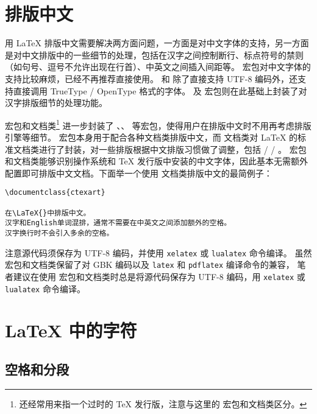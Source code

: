 \section{排版中文}\label{sec:chinese}

用 \LaTeX{} 排版中文需要解决两方面问题，一方面是对中文字体的支持，另一方面是对中文排版中的一些细节的处理，包括在汉字之间控制断行、标点符号的禁则（如句号、逗号不允许出现在行首）、中英文之间插入间距等。 宏包对中文字体的支持比较麻烦，已经不再推荐直接使用。
 和  除了直接支持 UTF-8 编码外，还支持直接调用 TrueType / OpenType 格式的字体。 及  宏包则在此基础上封装了对汉字排版细节的处理功能。

 宏包和文档类\footnote{ 还经常用来指一个过时的 \TeX{} 发行版，注意与这里的  宏包和文档类区分。}%
进一步封装了 、、 等宏包，使得用户在排版中文时不用再考虑排版引擎等细节。 宏包本身用于配合各种文档类排版中文，而  文档类对 \LaTeX{} 的标准文档类进行了封装，对一些排版根据中文排版习惯做了调整，包括  /  / 。
 宏包和文档类能够识别操作系统和 \TeX{} 发行版中安装的中文字体，因此基本无需额外配置即可排版中文文档。下面举一个使用  文档类排版中文的最简例子：

\begin{verbatim}
\documentclass{ctexart}

在\LaTeX{}中排版中文。
汉字和English单词混排，通常不需要在中英文之间添加额外的空格。
汉字换行时不会引入多余的空格。

\end{verbatim}

注意源代码须保存为 UTF-8 编码，并使用 \texttt{xelatex} 或 \texttt{lualatex} 命令编译。
虽然  宏包和文档类保留了对 GBK 编码以及 \texttt{latex} 和 \texttt{pdflatex} 编译命令的兼容，
笔者建议在使用  宏包和文档类时总是将源代码保存为 UTF-8 编码，用 \texttt{xelatex} 或 \texttt{lualatex} 命令编译。

\section{\LaTeX{} 中的字符}\label{sec:text-symbols}

\subsection{空格和分段}\label{subsec:spaces}

